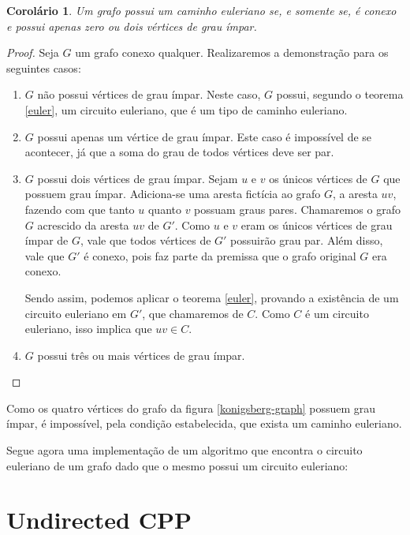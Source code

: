 \documentclass{article}
\newtheorem{corollary}{Corolário}
\begin{document}
\begin{corollary}
    Um grafo possui um caminho euleriano se, e somente se, é conexo e possui apenas zero ou dois vértices de grau ímpar.
\end{corollary}

\begin{proof}
    Seja $G$ um grafo conexo qualquer. Realizaremos a demonstração para os seguintes casos:
    \begin{enumerate}
        \item $G$ não possui vértices de grau ímpar. Neste caso, $G$ possui, segundo o teorema \ref{euler}, um circuito euleriano, que é um tipo de caminho euleriano.
        
        \item $G$ possui apenas um vértice de grau ímpar. Este caso é impossível de se acontecer, já que a soma do grau de todos vértices deve ser par.
        
        \item $G$ possui dois vértices de grau ímpar. 
        Sejam $u$ e $v$ os únicos vértices de $G$ que possuem grau ímpar.
        Adiciona-se uma aresta fictícia ao grafo $G$, a aresta $uv$, fazendo com que tanto $u$ quanto $v$ possuam graus pares. 
		Chamaremos o grafo $G$ acrescido da aresta $uv$ de $G'$.
        Como $u$ e $v$ eram os únicos vértices de grau ímpar de $G$, vale que todos vértices de $G'$ possuirão grau par. 
		Além disso, vale que $G'$ é conexo, pois faz parte da premissa que o grafo original $G$ era conexo.

        Sendo assim, podemos aplicar o teorema \ref{euler}, provando a existência de um circuito euleriano em $G'$, que chamaremos de $C$.
        Como $C$ é um circuito euleriano, isso implica que $uv \in C$.

        \item $G$ possui três ou mais vértices de grau ímpar.
    \end{enumerate}
\end{proof}


Como os quatro vértices do grafo da figura \ref{konigsberg-graph} possuem grau ímpar, é impossível, pela condição estabelecida, que exista um caminho euleriano.


Segue agora uma implementação de um algoritmo que encontra o circuito euleriano de um grafo dado que o mesmo possui um circuito euleriano:


 

\section{Undirected CPP}
\end{document}
